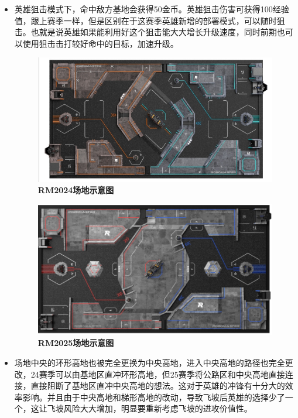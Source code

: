 \begin{itemize}
            \item 英雄狙击模式下，命中敌方基地会获得50金币。英雄狙击伤害可获得100经验值，跟上赛季一样，但是区别在于这赛季英雄新增的部署模式，可以随时狙击。也就是说英雄如果能利用好这个狙击能大大增长升级速度，同时前期也可以使用狙击击打较好命中的目标，加速升级。

            \begin{figure}[H]
                \centering
                \includegraphics[height=0.35\textwidth]{figure/RM2024_map.png}
                \hspace{0.5em}
                \caption{\textbf{\textbf{RM2024场地示意图}}}
                \label{fig:RM2024_map}
            \end{figure}

            
            \begin{figure}[H]
                \centering
                \includegraphics[height=0.35\textwidth]{figure/RM2025_map.png}
                \hspace{0.5em}
                \caption{\textbf{\textbf{RM2025场地示意图}}}
                \label{fig:RM2025_map}
            \end{figure}

            \item 场地中央的环形高地也被完全更换为中央高地，进入中央高地的路径也完全更改，24赛季可以由基地区直冲环形高地，但25赛季将公路区和中央高地直接连接，直接阻断了基地区直冲中央高地的想法。这对于英雄的冲锋有十分大的效率影响。并且由于中央高地和梯形高地的改动，导致飞坡后英雄的选择少了一个，这让飞坡风险大大增加，明显要重新考虑飞坡的进攻价值性。


\end{itemize}
